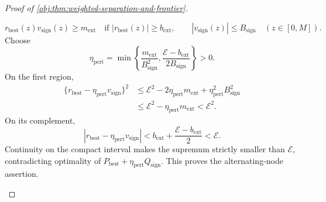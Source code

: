 \begin{proof}[Proof of \cref{obj:thm:weighted-separation-and-frontier}]
\begin{enumerate}
\[
r_{\mathrm{best}}(z)v_{\mathrm{sign}}(z)\ge m_{\mathrm{ext}}
\quad\text{if }|r_{\mathrm{best}}(z)|\ge b_{\mathrm{ext}},
\qquad
|v_{\mathrm{sign}}(z)|\le B_{\mathrm{sign}}
\quad(z\in[0,M]).
\]
Choose
\[
\eta_{\mathrm{pert}}
=\min\left\{
\frac{m_{\mathrm{ext}}}{B_{\mathrm{sign}}^2},
\frac{\mathcal E-b_{\mathrm{ext}}}{2B_{\mathrm{sign}}}
\right\}>0.
\]
On the first region,
\[
\begin{aligned}
\{r_{\mathrm{best}}-\eta_{\mathrm{pert}}v_{\mathrm{sign}}\}^2
&\le
\mathcal E^2-2\eta_{\mathrm{pert}}m_{\mathrm{ext}}
+\eta_{\mathrm{pert}}^2B_{\mathrm{sign}}^2\\
&\le\mathcal E^2-\eta_{\mathrm{pert}}m_{\mathrm{ext}}
<\mathcal E^2.
\end{aligned}
\]
On its complement,
\[
|r_{\mathrm{best}}-\eta_{\mathrm{pert}}v_{\mathrm{sign}}|
<
b_{\mathrm{ext}}+\frac{\mathcal E-b_{\mathrm{ext}}}{2}
<\mathcal E.
\]
Continuity on the compact interval makes the supremum strictly smaller than \(\mathcal E\), contradicting optimality of
\(P_{\mathrm{best}}+\eta_{\mathrm{pert}}Q_{\mathrm{sign}}\). This proves the alternating-node assertion.


\end{enumerate}
\end{proof}
